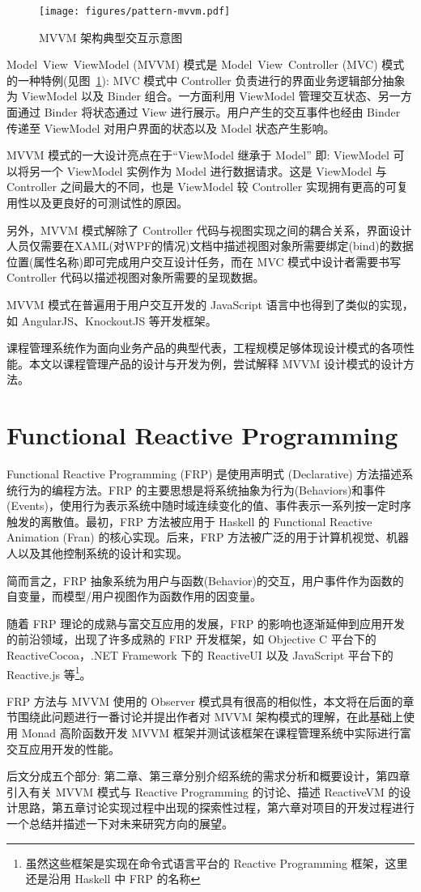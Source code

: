 \begin{figure}[!h]
\begin{center}
\texttt{[image: figures/pattern-mvvm.pdf]}
\caption{MVVM 架构典型交互示意图\label{MVVMOverview}}
\end{center}
\end{figure}

Model~View~ViewModel (MVVM) 模式是 Model~View~Controller (MVC) 模式的一种特例(见图~\ref{MVVMOverview}): MVC 模式中 Controller 负责进行的界面业务逻辑部分抽象为 ViewModel 以及 Binder 组合。一方面利用 ViewModel 管理交互状态、另一方面通过 Binder 将状态通过 View 进行展示。用户产生的交互事件也经由 Binder 传递至 ViewModel 对用户界面的状态以及 Model 状态产生影响。

MVVM 模式的一大设计亮点在于“ViewModel 继承于 Model” 即: ViewModel 可以将另一个 ViewModel 实例作为 Model 进行数据请求。这是 ViewModel 与 Controller 之间最大的不同，也是 ViewModel 较 Controller 实现拥有更高的可复用性以及更良好的可测试性的原因。

另外，MVVM 模式解除了 Controller 代码与视图实现之间的耦合关系，界面设计人员仅需要在XAML(对WPF的情况)文档中描述视图对象所需要绑定(bind)的数据位置(属性名称)即可完成用户交互设计任务，而在 MVC 模式中设计者需要书写 Controller 代码以描述视图对象所需要的呈现数据。

MVVM 模式在普遍用于用户交互开发的 JavaScript 语言中也得到了类似的实现，如 AngularJS、KnockoutJS 等开发框架。

课程管理系统作为面向业务产品的典型代表，工程规模足够体现设计模式的各项性能。本文以课程管理产品的设计与开发为例，尝试解释 MVVM 设计模式的设计方法。

\section{Functional Reactive Programming}

Functional Reactive Programming (FRP) 是使用声明式 (Declarative) 方法描述系统行为的编程方法。FRP 的主要思想是将系统抽象为行为(Behaviors)和事件(Events)，使用行为表示系统中随时域连续变化的值、事件表示一系列按一定时序触发的离散值\cite{Wan:2000:FRP:358438.349331}。最初，FRP 方法被应用于 Haskell 的 Functional Reactive Animation (Fran) 的核心实现\cite{Elliott:1997:FRA:258949.258973}。后来，FRP 方法被广泛的用于计算机视觉、机器人以及其他控制系统的设计和实现。

简而言之，FRP 抽象系统为用户与函数(Behavior)的交互，用户事件作为函数的自变量，而模型/用户视图作为函数作用的因变量。

随着 FRP 理论的成熟与富交互应用的发展，FRP 的影响也逐渐延伸到应用开发的前沿领域，出现了许多成熟的 FRP 开发框架，如 Objective C 平台下的 ReactiveCocoa，.NET Framework 下的 ReactiveUI 以及 JavaScript 平台下的 Reactive.js 等\footnote{虽然这些框架是实现在命令式语言平台的 Reactive Programming 框架，这里还是沿用 Haskell 中 FRP 的名称}。

FRP 方法与 MVVM 使用的 Observer 模式具有很高的相似性，本文将在后面的章节围绕此问题进行一番讨论并提出作者对 MVVM 架构模式的理解，在此基础上使用 Monad 高阶函数\cite{raey}开发 MVVM 框架并测试该框架在课程管理系统中实际进行富交互应用开发的性能。

后文分成五个部分: 第二章、第三章分别介绍系统的需求分析和概要设计，第四章引入有关 MVVM 模式与 Reactive Programming 的讨论、描述 ReactiveVM 的设计思路，第五章讨论实现过程中出现的探索性过程，第六章对项目的开发过程进行一个总结并描述一下对未来研究方向的展望。

